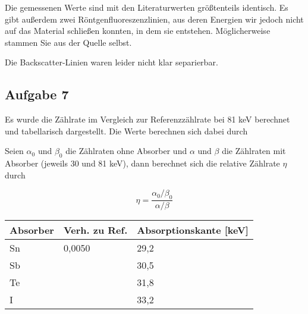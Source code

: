 \documentclass[a4paper,german,12pt,smallheadings]{scrartcl}
\begin{document}
Die gemessenen Werte sind mit den Literaturwerten größtenteils identisch. Es
gibt außerdem zwei Röntgenfluoreszenzlinien, aus deren Energien wir jedoch
nicht auf das Material schließen konnten, in dem sie entstehen. Möglicherweise
stammen Sie aus der Quelle selbst.

Die Backscatter-Linien waren leider nicht klar separierbar.

\subsection{Aufgabe 7}

Es wurde die Zählrate im Vergleich zur Referenzzählrate bei 81 keV berechnet
und tabellarisch dargestellt. Die Werte berechnen sich dabei durch

Seien $\alpha_0$ und $\beta_0$ die Zählraten ohne Absorber und $\alpha$ und
$\beta$ die Zählraten mit Absorber (jeweils 30 und 81 keV), dann berechnet sich
die relative Zählrate $\eta$ durch

\begin{equation}
  \eta = \frac{\alpha_0 / \beta_0}{\alpha / \beta}
\end{equation}

\begin{tabular}{l|l|l}
  Absorber & Verh. zu Ref. & Absorptionskante [keV] \\
  \hline
  Sn & 0{,}0050 & 29{,}2 \\
  Sb & & 30{,}5 \\
  Te & & 31{,}8 \\
  I & & 33{,}2 \\
\end{tabular}
\vspace{22pt}


\begin{landscape}
  
\end{landscape}
\begin{landscape}
  
\end{landscape}
\begin{landscape}
  
\end{landscape}
\begin{landscape}
  
\end{landscape}
\begin{landscape}
  
\end{landscape}
\begin{landscape}
  
\end{landscape}
\end{document}
